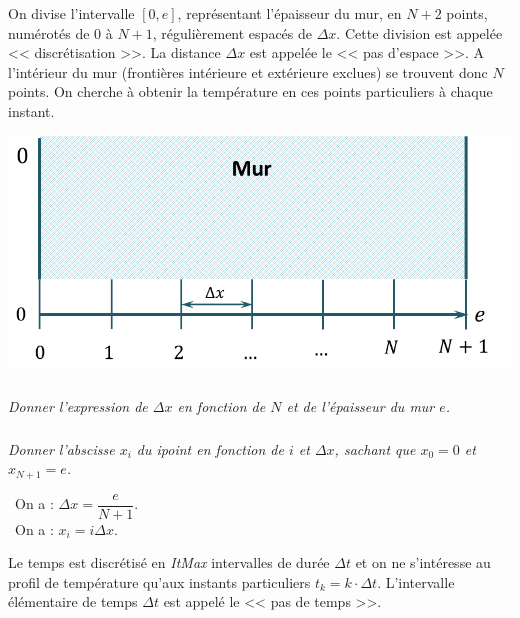 \noindent \begin{minipage}[c]{.6\linewidth}
On divise l'intervalle $[0,e]$, représentant l'épaisseur du mur, en $N+2$ points, numérotés de 0 à $N+1$, régulièrement 
espacés de $\Delta x$. Cette division est appelée << discrétisation >>. La distance $\Delta x$ est appelée le << pas 
d’espace >>. A l'intérieur du mur (frontières intérieure et extérieure exclues) se trouvent donc $N$ points. On cherche 
à obtenir la température en ces points particuliers à chaque instant. 


\end{minipage} \hfill
\begin{minipage}[c]{.38\linewidth}
\begin{center}
\includegraphics[width=\linewidth]{images/figure_02}
\end{center}
\end{minipage}

\subparagraph{\label{q_xini}}\textit{Donner l'expression de $\Delta x$ en fonction de $N$ et de l'épaisseur du mur $e$.}



\subparagraph{\label{q_xini2}}\textit{Donner l'abscisse $x_i$ du i\ieme point 
en fonction de $i$ et $\Delta x$, sachant que $x_0=0$ et  $x_{N+1} = e$.}

\fi

\ifprof
\begin{corrige}
\question\
On a : $\Delta x = \dfrac{e}{N+1}$.\\

\question\
On a : $x_i = i \Delta x$.
\end{corrige}
\else

\vspace{.5cm}

Le temps est discrétisé en \textit{ItMax} intervalles de durée $\Delta t$ et on ne s'intéresse 
au profil de température qu'aux instants particuliers $t_k = k \cdot \Delta t$. 
L'intervalle élémentaire de temps $\Delta t$ est appelé le << pas de temps >>.

